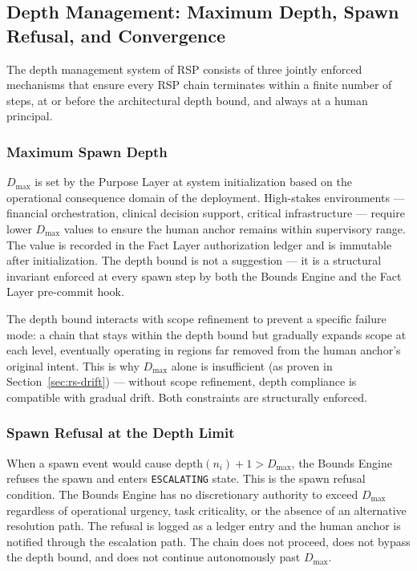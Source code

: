 \subsection{Depth Management: Maximum Depth, Spawn Refusal, and Convergence}

The depth management system of RSP consists of three jointly enforced mechanisms that ensure every RSP chain terminates within a finite number of steps, at or before the architectural depth bound, and always at a human principal.

\subsubsection{Maximum Spawn Depth}

$D_{\max}$ is set by the Purpose Layer at system initialization based on the operational consequence domain of the deployment. High-stakes environments — financial orchestration, clinical decision support, critical infrastructure — require lower $D_{\max}$ values to ensure the human anchor remains within supervisory range. The value is recorded in the Fact Layer authorization ledger and is immutable after initialization. The depth bound is not a suggestion — it is a structural invariant enforced at every spawn step by both the Bounds Engine and the Fact Layer pre-commit hook.

The depth bound interacts with scope refinement to prevent a specific failure mode: a chain that stays within the depth bound but gradually expands scope at each level, eventually operating in regions far removed from the human anchor's original intent. This is why $D_{\max}$ alone is insufficient (as proven in Section~\ref{sec:rs-drift}) — without scope refinement, depth compliance is compatible with gradual drift. Both constraints are structurally enforced.

\subsubsection{Spawn Refusal at the Depth Limit}

When a spawn event would cause $\text{depth}(n_i) + 1 > D_{\max}$, the Bounds Engine refuses the spawn and enters \texttt{ESCALATING} state. This is the spawn refusal condition. The Bounds Engine has no discretionary authority to exceed $D_{\max}$ regardless of operational urgency, task criticality, or the absence of an alternative resolution path. The refusal is logged as a ledger entry and the human anchor is notified through the escalation path. The chain does not proceed, does not bypass the depth bound, and does not continue autonomously past $D_{\max}$.


